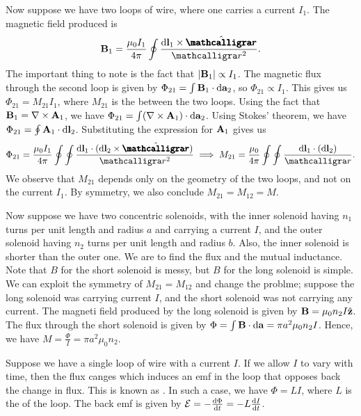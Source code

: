 Now suppose we have two loops of wire, where one carries a current $I_{1}$. The magnetic field produced is
\begin{align}
    \bv{B}_{1} = \frac{\mu_{0}I_{1}}{4 \pi} \oint \frac{\di{\bv{l}_{1}} \times \hat{\bcurs{r}}}{\curs{r}^{2}}.
\end{align}
The important thing to note is the fact that $\left| \mathbf{B}_{1} \right| \propto I_{1}$. The magnetic flux through the second loop is given by $\Phi_{21} = \int \mathbf{B}_{1} \cdot \mathrm{d}\mathbf{a}_{2}$, so $\Phi_{21} \propto I_{1}$. This gives us $\Phi_{21} = M_{21} I_{1}$, where $M_{21}$ is the  between the two loops. Using the fact that $\mathbf{B}_{1} = \nabla \times \mathbf{A}_{1}$, we have $\Phi_{21} = \int (\nabla \times \mathbf{A}_{1}) \cdot \mathrm{d}\mathbf{a}_{2}$. Using Stokes' theorem, we have $\Phi_{21} = \oint \mathbf{A}_{1} \cdot \mathrm{d}\mathbf{l}_{2}$. Substituting the expression for $\mathbf{A}_{1}$ gives us
\begin{align}
    \Phi_{21} = \frac{\mu_{0} I_{1}}{4 \pi} \oint \oint \frac{\di{\bv{l}_{1}} \cdot (\di{\bv{l}_{2}} \times \hat{\bcurs{r}})}{\curs{r}^{2}} \implies M_{21} = \frac{\mu_{0}}{4 \pi} \oint \oint \frac{\di{\bv{l}_{1}} \cdot (\di{\bv{l}_{2}})}{\curs{r}}.
\end{align}
We observe that $M_{21}$ depends only on the geometry of the two loops, and not on the current $I_{1}$. By symmetry, we also conclude $M_{21} = M_{12} = M$.

Now suppose we have two concentric solenoids, with the inner solenoid having $n_{1}$ turns per unit length and radius $a$ and carrying a current $I$, and the outer solenoid having $n_{2}$ turns per unit length and radius $b$. Also, the inner solenoid is shorter than the outer one. We are to find the flux and the mutual inductance. Note that $B$ for the short solenoid is messy, but $B$ for the long solenoid is simple. We can exploit the symmetry of $M_{21} = M_{12}$ and change the problme; suppose the long solenoid was carrying current $I$, and the short solenoid was not carrying any current. The magneti field produced by the long solenoid is given by $\mathbf{B} = \mu_{0} n_{2} I \hat{\mathbf{z}}$. The flux through the short solenoid is given by $\Phi = \int \mathbf{B} \cdot \mathrm{d}\mathbf{a} = \pi a^{2} \mu_{0} n_{2} I$. Hence, we have $M = \frac{\Phi}{I} = \pi a^{2} \mu_{0} n_{2}$.

Suppose we have a single loop of wire with a current $I$. If we allow $I$ to vary with time, then the flux canges which induces an emf in the loop that opposes back the change in flux. This is known as . In such a case, we have $\Phi = LI$, where $L$ is the  of the loop. The back emf is given by $\mathcal{E} = -\frac{\mathrm{d}\Phi}{\mathrm{d}t} = -L \frac{\mathrm{d}I}{\mathrm{d}t}$.

